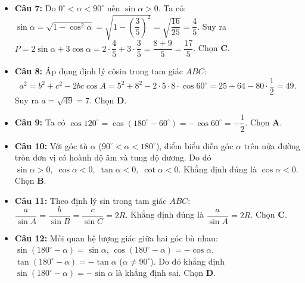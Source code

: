 \documentclass[12pt,a4paper]{article}
\begin{document}
\begin{itemize}[leftmargin=0.6cm, itemsep=2.5pt]
    \item \textbf{Câu 7:} Do $0^\circ < \alpha < 90^\circ$ nên $\sin \alpha > 0$.
    Ta có: $\sin \alpha = \sqrt{1 - \cos^2 \alpha} = \sqrt{1 - \left(\dfrac{3}{5}\right)^2} = \sqrt{\dfrac{16}{25}} = \dfrac{4}{5}$.
    Suy ra $P = 2\sin \alpha + 3\cos \alpha = 2 \cdot \dfrac{4}{5} + 3 \cdot \dfrac{3}{5} = \dfrac{8 + 9}{5} = \dfrac{17}{5}$. Chọn \textbf{C}.

    \item \textbf{Câu 8:} Áp dụng định lý côsin trong tam giác $ABC$:
    \[
    a^2 = b^2 + c^2 - 2bc \cos A = 5^2 + 8^2 - 2 \cdot 5 \cdot 8 \cdot \cos 60^\circ = 25 + 64 - 80 \cdot \dfrac{1}{2} = 49.
    \]
    Suy ra $a = \sqrt{49} = 7$. Chọn \textbf{D}.

    \item \textbf{Câu 9:} Ta có $\cos 120^\circ = \cos(180^\circ - 60^\circ) = -\cos 60^\circ = -\dfrac{1}{2}$. Chọn \textbf{A}.

    \item \textbf{Câu 10:} Với góc tù $\alpha$ ($90^\circ < \alpha < 180^\circ$), điểm biểu diễn góc $\alpha$ trên nửa đường tròn đơn vị có hoành độ âm và tung độ dương. Do đó $\sin \alpha > 0,\; \cos \alpha < 0,\; \tan \alpha < 0,\; \cot \alpha < 0$. Khẳng định đúng là $\cos \alpha < 0$. Chọn \textbf{B}.

    \item \textbf{Câu 11:} Theo định lý sin trong tam giác $ABC$: $\dfrac{a}{\sin A} = \dfrac{b}{\sin B} = \dfrac{c}{\sin C} = 2R$. Khẳng định đúng là $\dfrac{a}{\sin A} = 2R$. Chọn \textbf{C}.

    \item \textbf{Câu 12:} Mối quan hệ lượng giác giữa hai góc bù nhau: $\sin(180^\circ - \alpha) = \sin \alpha$, $\cos(180^\circ - \alpha) = -\cos \alpha$, $\tan(180^\circ - \alpha) = -\tan \alpha$ ($\alpha \ne 90^\circ$). Do đó khẳng định $\sin(180^\circ - \alpha) = -\sin \alpha$ là khẳng định sai. Chọn \textbf{D}.
\end{itemize}
\end{document}
